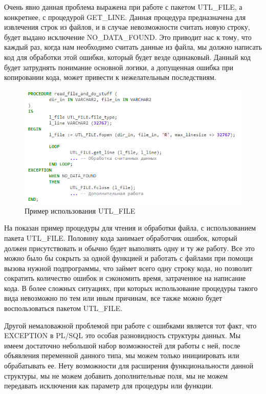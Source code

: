 Очень явно данная проблема выражена при работе с пакетом UTL\_FILE, а конкретнее, с процедурой GET\_LINE. Данная процедура предназначена для извлечения строк из файлов, и в случае невозможности считать новую строку, будет выдано исключение NO\_DATA\_FOUND. Это приводит нас к тому, что каждый раз, когда нам необходимо считать данные из файла, мы должно написать код для обработки этой ошибки, который будет везде одинаковый. Данный код будет затруднять понимание основной логики, а допущенная ошибка при копировании кода, может привести к нежелательным последствиям\cite{utl-file}. 

\begin{figure}[ht!] 
	\center
	\includegraphics [scale=1] {my_folder/img/C1_utl_file_problem}
	\caption{Пример использования UTL\_FILE} 
	\label{fig:C1_utl_file_problem}  
\end{figure}
\FloatBarrier

На  показан пример процедуры для чтения и обработки файла, с использованием пакета UTL\_FILE. Половину кода занимает обработчик ошибок, который должен присутствовать и обычно будет выполнять одну и ту же работу. Все это можно было бы сокрыть за одной функцией и работать с файлами при помощи вызова нужной подпрограммы, что займет всего одну строку кода, но позволит сократить количество ошибок и сэкономить время, затраченное на написание кода. В более сложных ситуациях, при которых использование процедуры такого вида невозможно по тем или иным причинам, все также можно будет воспользоваться пакетом UTL\_FILE.

Другой немаловажной проблемой при работе с ошибками является тот факт, что EXCEPTION в PL/SQL это особая разновидность структуры данных. Мы имеем достаточно небольшой набор возможностей для работы с ней, после объявления переменной данного типа, мы можем только инициировать или обрабатывать ее. Нету возможности для расширения функциональности данной структуры, мы не можем добавить дополнительные поля, мы не можем передавать исключения как параметр для процедуры или функции.

